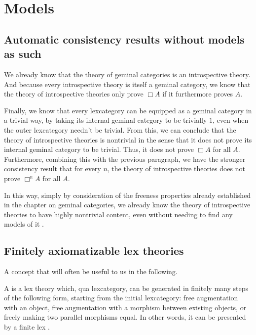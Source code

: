 \section{Models}

\subsection{Automatic consistency results without models as such}
We already know that the theory of geminal categories is an introspective theory. And because every introspective theory is itself a geminal category, we know that the theory of introspective theories only prove $\Box A$ if it furthermore proves $A$.

Finally, we know that every lexcategory can be equipped as a geminal category in a trivial way, by taking its internal geminal category to be trivially $1$, even when the outer lexcategory needn't be trivial. From this, we can conclude that the theory of introspective theories is nontrivial in the sense that it does not prove its internal geminal category to be trivial. Thus, it does not prove $\Box A$ for all $A$. Furthermore, combining this with the previous paragraph, we have the stronger consistency result that for every $n$, the theory of introspective theories does not prove $\Box^n A$ for all $A$.

In this way, simply by consideration of the freeness properties already established in the chapter on geminal categories, we already know the theory of introspective theories to have highly nontrivial content, even without needing to find any models of it .


\subsection{Finitely axiomatizable lex theories}
A concept that will often be useful to us in the following.

\begin{definition}
A  is a lex theory which, qua lexcategory, can be generated in finitely many steps of the following form, starting from the initial lexcategory: free augmentation with an object, free augmentation with a morphism between existing objects, or freely making two parallel morphisms equal. In other words, it can be presented by a finite lex . 
\end{definition}


